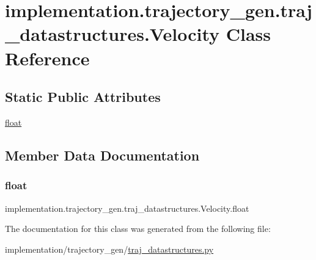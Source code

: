 \hypertarget{classimplementation_1_1trajectory__gen_1_1traj__datastructures_1_1_velocity}{}\section{implementation.\+trajectory\+\_\+gen.\+traj\+\_\+datastructures.\+Velocity Class Reference}
\label{classimplementation_1_1trajectory__gen_1_1traj__datastructures_1_1_velocity}
\subsection*{Static Public Attributes}
\begin{DoxyCompactItemize}
\item 
\hyperlink{classimplementation_1_1trajectory__gen_1_1traj__datastructures_1_1_velocity_a1671ecab6b9c9aef24e46c8b27c92158}{float}
\end{DoxyCompactItemize}


\subsection{Member Data Documentation}
\mbox{\label{classimplementation_1_1trajectory__gen_1_1traj__datastructures_1_1_velocity_a1671ecab6b9c9aef24e46c8b27c92158}} 
\subsubsection{\texorpdfstring{float}{float}}
{\footnotesize\ttfamily implementation.\+trajectory\+\_\+gen.\+traj\+\_\+datastructures.\+Velocity.\+float\hspace{0.3cm}{\ttfamily [static]}}



The documentation for this class was generated from the following file\+:\begin{DoxyCompactItemize}
\item 
implementation/trajectory\+\_\+gen/\hyperlink{traj__datastructures_8py}{traj\+\_\+datastructures.\+py}\end{DoxyCompactItemize}
